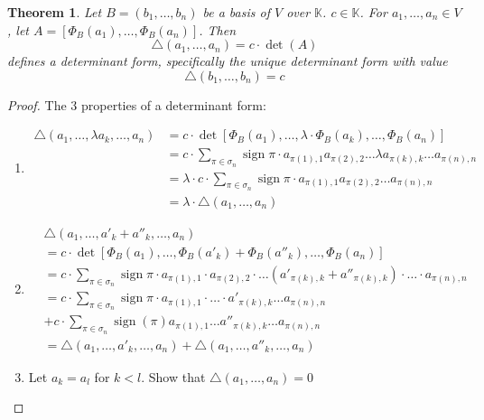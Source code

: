 \documentclass[a4paper,landscape,twocolumn]{article}
\newtheorem{theorem}{Theorem}
\DeclareMathOperator\sign{sign}
\begin{document}
\begin{theorem}
  \label{satz-7.22}
  Let $B = (b_1, \ldots, b_n)$ be a basis of $V$ over $\mathbb K$. $c \in \mathbb K$.
  For $a_1, \ldots, a_n \in V$, let $A = \left[\Phi_B(a_1), \ldots, \Phi_B(a_n)\right]$.
  Then
  \[ \triangle(a_1, \ldots, a_n) = c \cdot \det(A) \]
  defines a determinant form, specifically the unique determinant form with value
  \[ \triangle(b_1, \ldots, b_n) = c \]
\end{theorem}
\begin{proof}
  The 3 properties of a determinant form:
  \begin{enumerate}
    \item
      \begin{align*}
        \triangle(a_1, \ldots, \lambda a_k, \ldots, a_n)
        &= c \cdot \det\left[\Phi_B(a_1), \ldots, \lambda \cdot \Phi_B(a_k), \ldots, \Phi_B(a_n)\right] \\
        &= c \cdot \sum_{\pi \in \sigma_n} \sign{\pi} \cdot a_{\pi(1),1} a_{\pi(2),2} \ldots \lambda a_{\pi(k),k} \ldots a_{\pi(n),n} \\
        &= \lambda \cdot c \cdot \sum_{\pi \in \sigma_n} \sign{\pi} \cdot a_{\pi(1),1} a_{\pi(2),2} \ldots a_{\pi(n),n} \\
        &= \lambda \cdot \triangle(a_1, \ldots, a_n)
      \end{align*}
    \item
      \begin{align*}
        & \triangle(a_1, \ldots, a'_k + a''_k, \ldots, a_n) \\
          &= c \cdot \det\left[\Phi_B(a_1), \ldots, \Phi_B(a'_k) + \Phi_B(a''_k), \ldots, \Phi_B(a_n)\right] \\
          &= c \cdot \sum_{\pi \in \sigma_n} \sign{\pi} \cdot a_{\pi(1),1} \cdot a_{\pi(2),2} \cdot \ldots
             \left(a'_{\pi(k),k} + a''_{\pi(k),k}\right) \cdot \ldots \cdot a_{\pi(n),n} \\
          &= c \cdot \sum_{\pi \in \sigma_n} \sign{\pi} \cdot a_{\pi(1),1} \cdot \ldots \cdot a'_{\pi(k),k} \ldots a_{\pi(n),n} \\
          &+ c \cdot \sum_{\pi \in \sigma_n} \sign(\pi) a_{\pi(1),1} \ldots a''_{\pi(k),k} \ldots a_{\pi(n),n} \\
          &= \triangle(a_1, \ldots, a'_k, \ldots, a_n) + \triangle(a_1, \ldots, a''_k, \ldots, a_n)
      \end{align*}
    \item
      Let $a_k = a_l$ for $k < l$. Show that $\triangle(a_1, \ldots, a_n) = 0$

\end{enumerate}
\end{proof}
\end{document}
